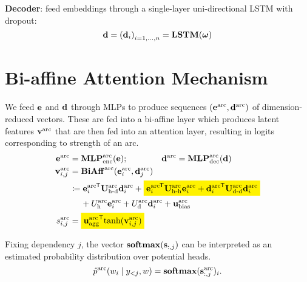\documentclass{report}
\theoremstyle{definition}
\theoremstyle{plain}
\theoremstyle{definition}
\theoremstyle{remark}
\numberwithin{equation}{section}
\numberwithin{figure}{section}
\numberwithin{table}{section}
\newcommand{\mathcolorbox}[2]{\colorbox{#1}{$\displaystyle #2$}}
\newcommand*{\tran}{^{\mkern-1.5mu\mathsf{T}}}
\begin{document}
\textbf{Decoder}: feed embeddings through a single-layer uni-directional LSTM with dropout:
\[
    \vb{d} = \qty(\vb{d}_{i})_{i = 1, \ldots, n} = \mathbf{LSTM}(\boldsymbol{\omega})
\]

\section{Bi-affine Attention Mechanism}
We feed \(\vb{e}\) and \(\vb{d}\) through MLPs to produce sequences \((\vb{e}^{\mathrm{arc}}, \vb{d}^{\mathrm{arc}})\) of dimension-reduced vectors. These are fed into a bi-affine layer which produces latent features \(\vb{v}^{\mathrm{arc}}\) that are then fed into an attention layer, resulting in logits corresponding to strength of an arc.
\begin{align}
    \vb{e}^{\mathrm{arc}} &= \mathbf{MLP}_{\mathrm{enc}}^{\mathrm{arc}}(\vb{e}); \qquad \qquad \vb{d}^{\mathrm{arc}} = \mathbf{MLP}_{\mathrm{dec}}^{\mathrm{arc}}(\vb{d}) \\
    \vb{v}^{\mathrm{arc}}_{i,j} &= \mathbf{BiAff}^{\mathrm{arc}}(\vb{e}^{\mathrm{arc}}_{i}, \vb{d}^{\mathrm{arc}}_{j}) \\
    &\coloneqq {\vb{e}^{\mathrm{arc}}_{i}}\tran \mathbf{U}_{\text{h-d}}^{\mathrm{arc}} \vb{d}_{i}^{\mathrm{arc}}  + \mathcolorbox{yellow}{
            {\vb{e}_{i}^{\mathrm{arc}}}\tran \mathbf{U}_{\text{h-h}}^{\mathrm{arc}} \vb{e}_{i}^{\mathrm{arc}}
            + {\vb{d}_{i}^{\mathrm{arc}}}\tran \mathbf{U}_{\text{d-d}}^{\mathrm{arc}} \vb{d}_{i}^{\mathrm{arc}}
        } \\
        &\phantom{\coloneqq}\  + U_{\text{h}}^{\mathrm{arc}} \vb{e}_{i}^{\mathrm{arc}}
        + U_{\text{d}}^{\mathrm{arc}} \vb{d}_{i}^{\mathrm{arc}}
        + \vb{u}_{\text{bias}}^{\mathrm{arc}} \\
        s_{i,j}^{\mathrm{arc}} &= \mathcolorbox{yellow}{{\vb{u}_{\text{agg}}^{\mathrm{arc}}} \tran \mathrm{tanh}(\vb{v}_{i,j}^{\mathrm{arc}})}
\end{align}

Fixing dependency \(j\), the vector \(\mathbf{softmax}(\vb{s}_{:, j})\) can be interpreted as an estimated probability distribution over potential heads.
\[
    \hat{p}^{\mathrm{arc}}(w_{i} \mid y_{<j}, w) = \mathbf{softmax}(\vb{s}_{:,j}^{\mathrm{arc}})_{i}.
\]
\end{document}
